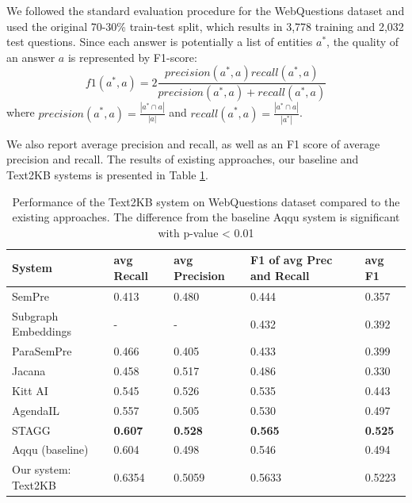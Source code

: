
We followed the standard evaluation procedure for the WebQuestions dataset and used the original 70-30\% train-test split, which results in 3,778 training and 2,032 test questions.
Since each answer is potentially a list of entities $a^*$, the quality of an answer $a$ is represented by F1-score: 
$$f1(a^*, a) = 2\frac{precision(a^*,a) recall(a^*,a)}{precision(a^*,a) + recall(a^*,a)}$$
where $precision(a^*, a)=\frac{|a^* \cap a|}{|a|}$ and $recall(a^*, a) = \frac{|a^* \cap a|}{|a^*|}$.

We also report average precision and recall, as well as an F1 score of average precision and recall.
The results of existing approaches, our baseline and Text2KB systems is presented in Table \ref{table:webquestions_results}.

\begin{table}
\centering
\caption{Performance of the Text2KB system on WebQuestions dataset compared to the existing approaches. The difference from the baseline Aqqu system is significant with p-value < 0.01}
\label{table:webquestions_results}
\begin{tabular}{| p{5cm} | p{1.5cm} | p{1.5cm} | p{1.5cm} | p{1.5cm} | }
\hline
System & avg Recall & avg Precision & F1 of avg Prec and Recall & avg F1 \\
\hline
SemPre \cite{Berant:EMNLP13} & 0.413 & 0.480 & 0.444 & 0.357\\
Subgraph Embeddings \cite{BordesCW14:emnlp} & - & - & 0.432 & 0.392\\
ParaSemPre \cite{berant2014semantic} & 0.466 & 0.405 & 0.433 & 0.399\\
Jacana \cite{yao2014information} & 0.458 & 0.517 & 0.486 & 0.330\\
Kitt AI \cite{yao-scratch-qa-naacl2015} & 0.545 & 0.526 & 0.535 & 0.443\\
AgendaIL \cite{berant2015imitation} & 0.557 & 0.505 & 0.530 & 0.497\\
STAGG \cite{yih2015semantic} & \textbf{0.607} & \textbf{0.528} & \textbf{0.565} & \textbf{0.525}\\
\hline
Aqqu (baseline) \cite{ACCU:2015} & 0.604 & 0.498 & 0.546 & 0.494\\
Our system: Text2KB & 0.6354 & 0.5059 & 0.5633 & 0.5223 \\
\hline
\end{tabular}
\end{table}

